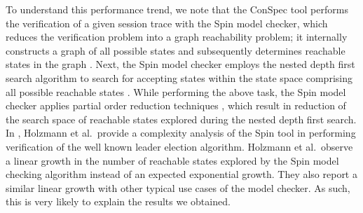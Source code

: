 \documentclass[journal,compsoc]{IEEEtran}
\begin{document}
To understand this performance trend, we note that the ConSpec tool performs the verification of a given session trace with the  Spin model checker, which reduces the verification problem into a graph reachability problem; it internally constructs a graph of all possible states and subsequently determines  reachable states in the graph \cite{Holzmann:1997:MCS:260897.260902}. Next, the Spin model checker  employs the nested depth first search algorithm \cite{DBLP:conf/dimacs/HolzmannPY96} to search for accepting states within the state space comprising all possible reachable states \cite{DBLP:conf/tacas/SchwoonE05}.
    While performing the above task, the Spin model checker  applies partial order reduction techniques \cite{Peled1994}, which result in reduction of the search space of reachable states explored during the nested depth first search. In  \cite{Holzmann:1997:MCS:260897.260902}, Holzmann et al.\ provide a complexity analysis of the Spin tool in performing verification of the well known leader election algorithm. Holzmann et al.\ observe a linear growth in the number of reachable states explored by the Spin model checking algorithm instead of an expected exponential growth. They also report a similar linear growth with other typical use cases of the model checker. As such, this is very likely to explain the results we obtained.


\end{document}
